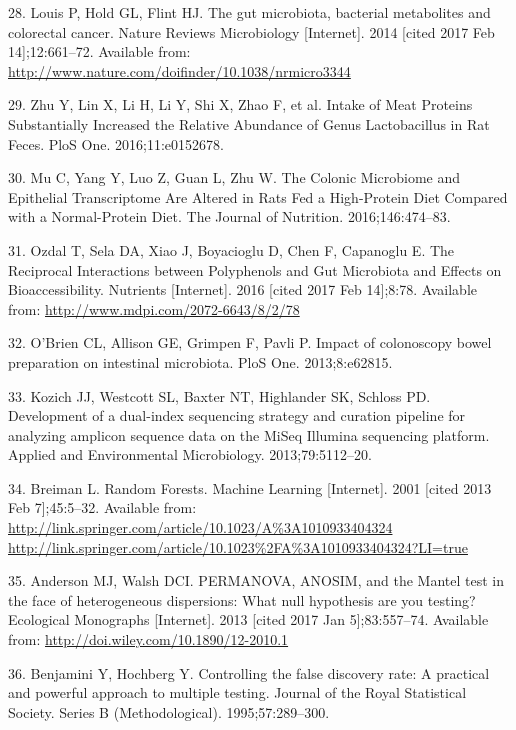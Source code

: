 \documentclass[12pt,]{article}
\begin{document}
\hypertarget{ref-louis_gut_2014}{}
28. Louis P, Hold GL, Flint HJ. The gut microbiota, bacterial
metabolites and colorectal cancer. Nature Reviews Microbiology
{[}Internet{]}. 2014 {[}cited 2017 Feb 14{]};12:661--72. Available from:
\url{http://www.nature.com/doifinder/10.1038/nrmicro3344}

\hypertarget{ref-zhu_intake_2016}{}
29. Zhu Y, Lin X, Li H, Li Y, Shi X, Zhao F, et al. Intake of Meat
Proteins Substantially Increased the Relative Abundance of Genus
Lactobacillus in Rat Feces. PloS One. 2016;11:e0152678.

\hypertarget{ref-mu_colonic_2016}{}
30. Mu C, Yang Y, Luo Z, Guan L, Zhu W. The Colonic Microbiome and
Epithelial Transcriptome Are Altered in Rats Fed a High-Protein Diet
Compared with a Normal-Protein Diet. The Journal of Nutrition.
2016;146:474--83.

\hypertarget{ref-ozdal_reciprocal_2016}{}
31. Ozdal T, Sela DA, Xiao J, Boyacioglu D, Chen F, Capanoglu E. The
Reciprocal Interactions between Polyphenols and Gut Microbiota and
Effects on Bioaccessibility. Nutrients {[}Internet{]}. 2016 {[}cited
2017 Feb 14{]};8:78. Available from:
\url{http://www.mdpi.com/2072-6643/8/2/78}

\hypertarget{ref-obrien_impact_2013}{}
32. O'Brien CL, Allison GE, Grimpen F, Pavli P. Impact of colonoscopy
bowel preparation on intestinal microbiota. PloS One. 2013;8:e62815.

\hypertarget{ref-kozich_development_2013}{}
33. Kozich JJ, Westcott SL, Baxter NT, Highlander SK, Schloss PD.
Development of a dual-index sequencing strategy and curation pipeline
for analyzing amplicon sequence data on the MiSeq Illumina sequencing
platform. Applied and Environmental Microbiology. 2013;79:5112--20.

\hypertarget{ref-breiman_random_2001}{}
34. Breiman L. Random Forests. Machine Learning {[}Internet{]}. 2001
{[}cited 2013 Feb 7{]};45:5--32. Available from:
\href{http://link.springer.com/article/10.1023/A\%3A1010933404324\%20http://link.springer.com/article/10.1023\%2FA\%3A1010933404324?LI=true}{http://link.springer.com/article/10.1023/A\%3A1010933404324 http://link.springer.com/article/10.1023\%2FA\%3A1010933404324?LI=true}

\hypertarget{ref-anderson_permanova_2013}{}
35. Anderson MJ, Walsh DCI. PERMANOVA, ANOSIM, and the Mantel test in
the face of heterogeneous dispersions: What null hypothesis are you
testing? Ecological Monographs {[}Internet{]}. 2013 {[}cited 2017 Jan
5{]};83:557--74. Available from:
\url{http://doi.wiley.com/10.1890/12-2010.1}

\hypertarget{ref-benjamini_controlling_1995}{}
36. Benjamini Y, Hochberg Y. Controlling the false discovery rate: A
practical and powerful approach to multiple testing. Journal of the
Royal Statistical Society. Series B (Methodological). 1995;57:289--300.
\end{document}
